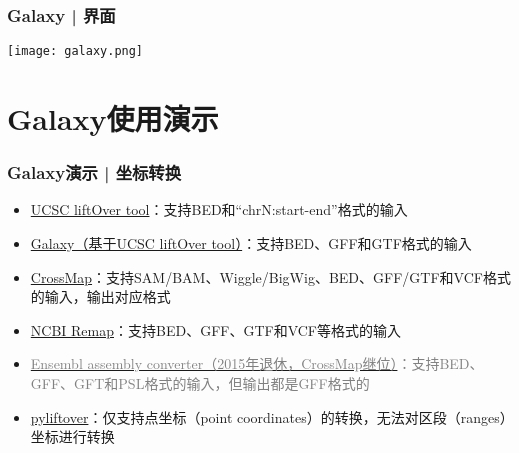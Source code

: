 \begin{frame}
  \frametitle{Galaxy | 界面}
  \begin{center}
    \texttt{[image: galaxy.png]}
  \end{center}
\end{frame}

\section{Galaxy使用演示}

\begin{frame}
  \frametitle{Galaxy演示 | \alert{坐标转换}}
  \begin{itemize}
    \item \href{http://genome.ucsc.edu/cgi-bin/hgLiftOver}{UCSC liftOver tool}：支持BED和“chrN:start-end”格式的输入
    \item \href{https://usegalaxy.org/}{Galaxy（基于UCSC liftOver tool）}：支持BED、GFF和GTF格式的输入
    \item \href{http://crossmap.sourceforge.net/}{CrossMap}：支持SAM/BAM、Wiggle/BigWig、BED、GFF/GTF和VCF格式的输入，输出对应格式
    \item \href{http://www.ncbi.nlm.nih.gov/genome/tools/remap}{NCBI Remap}：支持BED、GFF、GTF和VCF等格式的输入
    \item \href{http://asia.ensembl.org/Homo\_sapiens/UserData/SelectFeatures}{\textcolor{gray}{Ensembl assembly converter（2015年退休，CrossMap继位）}}\textcolor{gray}{：支持BED、GFF、GFT和PSL格式的输入，但输出都是GFF格式的}
    \item \href{https://pypi.python.org/pypi/pyliftover}{pyliftover}：仅支持点坐标（point coordinates）的转换，无法对区段（ranges）坐标进行转换
  \end{itemize}
\end{frame}

